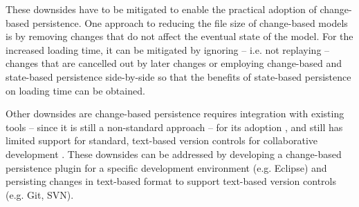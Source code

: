 These downsides have to be mitigated to enable the practical adoption of change-based persistence. 
One approach to reducing the file size of change-based models is by removing changes that do not affect the eventual 
state of the model. For the increased loading time, it can be mitigated by ignoring -- i.e. not replaying -- changes 
that are cancelled out by later changes or employing change-based and state-based persistence side-by-side so that the
benefits of state-based persistence on loading time can be obtained. 

Other downsides are change-based persistence requires 
integration with existing tools -- since it is still a non-standard approach -- for its adoption \cite{koegel2010emfstore}, 
and still has limited support for standard, text-based version controls for collaborative development \cite{koegel2010emfstore}. 
These downsides can be addressed by developing a change-based persistence plugin for a specific development environment 
(e.g. Eclipse) and persisting changes in text-based format to support text-based version controls (e.g. Git, SVN).

